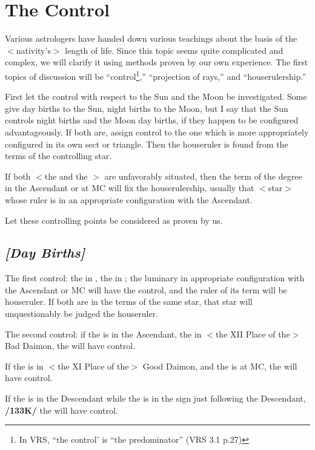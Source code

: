 \section{The Control}

Various astrologers have handed down various teachings about the basis of the $<$nativity’s$>$ length of life. Since this topic seems quite complicated and complex, we will clarify it using methods proven by our own experience. The first topics of discussion will be “control\footnote{In VRS, ``the control' is ``the predominator'' (VRS 3.1 p.27)},” “projection of rays,” and “houserulership.” 

First \mndl let the control with respect to the Sun and the Moon be investigated. Some give day births to the Sun, night births to the Moon, but I say that the Sun controls night births and the Moon day births, if they happen to be configured advantageously. If both are, assign control to the one which is more appropriately configured in its own sect or triangle. Then the houseruler is found from the terms of the controlling star. 

If both $<$the \Sun\xspace and the \Moon$>$ are unfavorably situated, then the term of the degree in the Ascendant or at MC will fix the houserulership, usually that $<$star$>$ whose ruler is in an appropriate configuration with the Ascendant.

Let these controlling points be considered as proven by us. 

\subsection{\textit{[Day Births]}}
The first control: the \Sun\xspace in \Leo, the \Moon\xspace in \Cancer; the luminary in appropriate configuration with the Ascendant or MC will have the control, and the ruler of its term will be houseruler. If both are in the terms of the same star, that star will unquestionably be judged the houseruler.

The second control: if the \Sun\xspace is in the Ascendant, the \Moon\xspace in $<$the XII Place of the$>$ Bad Daimon, the \Sun\xspace will have control. 

If the \Sun\xspace is in $<$the XI Place of the$>$ Good Daimon, and the \Moon\xspace is at MC, the \Sun\xspace will have control. 

If the \Sun\xspace is in the Descendant while the \Moon\xspace is in the sign just following the Descendant, \textbf{/133K/} the \Sun\xspace will have control. 


